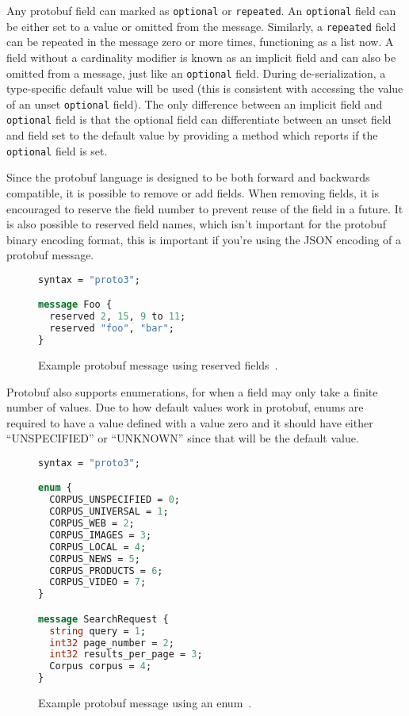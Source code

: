 \documentclass[11pt]{article}
\theoremstyle{definition}
\begin{document}
Any protobuf field can marked as \texttt{optional} or \texttt{repeated}. An
\texttt{optional} field can be either set to a value or omitted from the
message. Similarly, a \texttt{repeated} field can be repeated in the message
zero or more times, functioning as a list now. A field without a cardinality
modifier is known as an implicit field and can also be omitted from a message,
just like an \texttt{optional} field. During de-serialization, a type-specific
default value will be used (this is consistent with accessing the value of an
unset \texttt{optional} field). The only difference between an implicit field
and \texttt{optional} field is that the optional field can differentiate between
an unset field and field set to the default value by providing a method which
reports if the \texttt{optional} field is set.

Since the protobuf language is designed to be both forward and backwards
compatible, it is possible to remove or add fields. When removing fields, it is
encouraged to reserve the field number to prevent reuse of the field in a
future. It is also possible to reserved field names, which isn't important for
the protobuf binary encoding format, this is important if you're using the JSON
encoding of a protobuf message.

\begin{figure}[H]
	\begin{lstlisting}[language=proto]
syntax = "proto3";

message Foo {
  reserved 2, 15, 9 to 11;
  reserved "foo", "bar";
}\end{lstlisting}

	\caption{Example protobuf message using reserved fields~\cite{LanguageGuideProto}.}
	\label{fig:proto-reserved}
\end{figure}

Protobuf also supports enumerations, for when a field may only take a finite
number of values. Due to how default values work in protobuf, enums are required
to have a value defined with a value zero and it should have either
``UNSPECIFIED'' or ``UNKNOWN'' since that will be the default value.

\begin{figure}[H]
	\begin{lstlisting}[language=proto]
syntax = "proto3";

enum {
  CORPUS_UNSPECIFIED = 0;
  CORPUS_UNIVERSAL = 1;
  CORPUS_WEB = 2;
  CORPUS_IMAGES = 3;
  CORPUS_LOCAL = 4;
  CORPUS_NEWS = 5;
  CORPUS_PRODUCTS = 6;
  CORPUS_VIDEO = 7;
}

message SearchRequest {
  string query = 1;
  int32 page_number = 2;
  int32 results_per_page = 3;
  Corpus corpus = 4;
}\end{lstlisting}

	\caption{Example protobuf message using an enum~\cite{LanguageGuideProto}.}
	\label{fig:proto-enum}
\end{figure}
\end{document}
